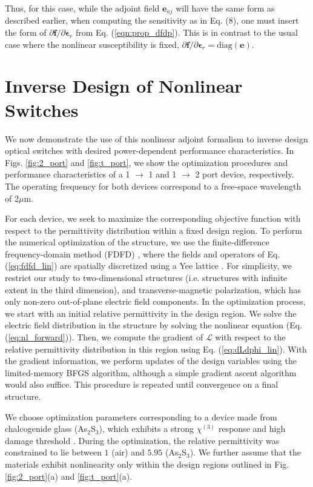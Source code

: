 Thus, for this case, while the adjoint field $\mathbf{e}_{aj}$ will have the same form as described earlier, when computing the sensitivity as in Eq. (8), one must insert the form of $\partial \mathbf{f} / \partial \bm{\epsilon}_r$ from Eq. (\ref{eqn:prop_dfdp}).  This is in contrast to the usual case where the nonlinear susceptibility is fixed, $\partial \mathbf{f} / \partial \bm{\epsilon}_r = \textrm{diag}\left( \mathbf{e} \right)$.

\section{Inverse Design of Nonlinear Switches}


We now demonstrate the use of this nonlinear adjoint formalism to inverse design optical switches with desired power-dependent performance characteristics.  In Figs. \ref{fig:2_port} and \ref{fig:t_port}, we show the optimization procedures and performance characteristics of a 1 $\to$ 1 and 1 $\to$ 2 port device, respectively. The operating frequency for both devices correspond to a free-space wavelength of 2$\mu$m. 

For each device, we seek to maximize the corresponding objective function with respect to the permittivity distribution within a fixed design region.  To perform the numerical optimization of the structure, we use the finite-difference frequency-domain method (FDFD) \cite{shin2012choice}, where the fields and operators of Eq. (\ref{eq:fdfd_lin}) are spatially discretized using a Yee lattice \cite{yee1966numerical}. For simplicity, we restrict our study to two-dimensional structures (i.e. structures with infinite extent in the third dimension), and transverse-magnetic polarization, which has only non-zero out-of-plane electric field components. In the optimization process, we start with an initial relative permittivity in the design region.  We solve the electric field distribution in the structure by solving the nonlinear equation (Eq. (\ref{eq:nl_forward})).  Then, we compute the gradient of $\mathcal{L}$ with respect to the relative permittivity distribution in this region using Eq. (\ref{eq:dLdphi_lin}).  With the gradient information, we perform updates of the design variables using the limited-memory BFGS \cite{byrd1995limited} algorithm, although a simple gradient ascent algorithm would also suffice.  This procedure is repeated until convergence on a final structure. 

We choose optimization parameters corresponding to a device made from chalcogenide glass (As$_2$S$_3$), which exhibits a strong $\chi^{(3)}$ response and high damage threshold \cite{White_OptLett_2011,Lamont_OptExpress_2008,Boyd__2008}.  During the optimization, the relative permittivity was constrained to lie between $1$ (air) and $5.95$ (As$_2$S$_3$).  We further assume that the materials exhibit nonlinearity only within the design regions outlined in Fig. \ref{fig:2_port}(a) and \ref{fig:t_port}(a).


